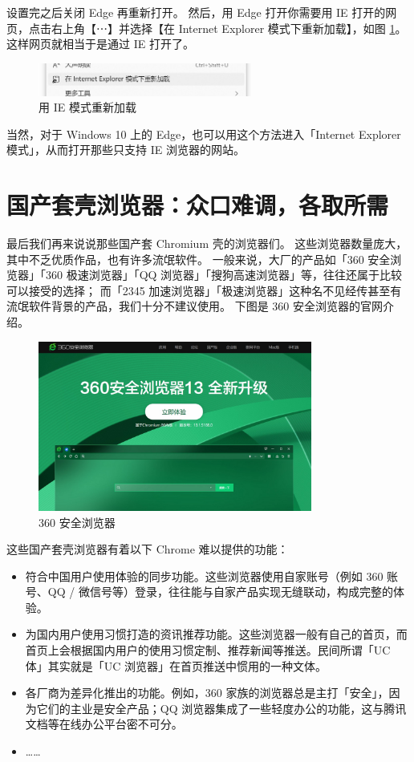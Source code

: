 设置完之后关闭 Edge 再重新打开。
然后，用 Edge 打开你需要用 IE 打开的网页，点击右上角【⋯】并选择【在 Internet Explorer 模式下重新加载】，如图 \ref{Reload_in_IE_Mode}。
这样网页就相当于是通过 IE 打开了。

\begin{figure}[htb!]
  \centering
  \includegraphics[width=7cm]{assets/Reload_in_IE_Mode.jpg}
  \caption{用 IE 模式重新加载}
  \label{Reload_in_IE_Mode}
\end{figure}

当然，对于 Windows 10 上的 Edge，也可以用这个方法进入「Internet Explorer 模式」，从而打开那些只支持 IE 浏览器的网站。

\section{国产套壳浏览器：众口难调，各取所需}

最后我们再来说说那些国产套 Chromium 壳的浏览器们。
这些浏览器数量庞大，其中不乏优质作品，也有许多流氓软件。
一般来说，大厂的产品如「360 安全浏览器」「360 极速浏览器」「QQ 浏览器」「搜狗高速浏览器」等，往往还属于比较可以接受的选择；
而「2345 加速浏览器」「极速浏览器」这种名不见经传甚至有流氓软件背景的产品，我们十分不建议使用。
下图是 360 安全浏览器的官网介绍。

\begin{figure}[htb!]
  \centering
  \includegraphics[width=9cm]{assets/360_se.jpg}
  \caption{360 安全浏览器}
  \label{360_se}
\end{figure}

这些国产套壳浏览器有着以下 Chrome 难以提供的功能：

\begin{itemize}
  \item 符合中国用户使用体验的同步功能。这些浏览器使用自家账号（例如 360 账号、QQ / 微信号等）登录，往往能与自家产品实现无缝联动，构成完整的体验。
  \item 为国内用户使用习惯打造的资讯推荐功能。这些浏览器一般有自己的首页，而首页上会根据国内用户的使用习惯定制、推荐新闻等推送。民间所谓「UC 体」其实就是「UC 浏览器」在首页推送中惯用的一种文体。
  \item 各厂商为差异化推出的功能。例如，360 家族的浏览器总是主打「安全」，因为它们的主业是安全产品；QQ 浏览器集成了一些轻度办公的功能，这与腾讯文档等在线办公平台密不可分。
  \item ……
\end{itemize}


